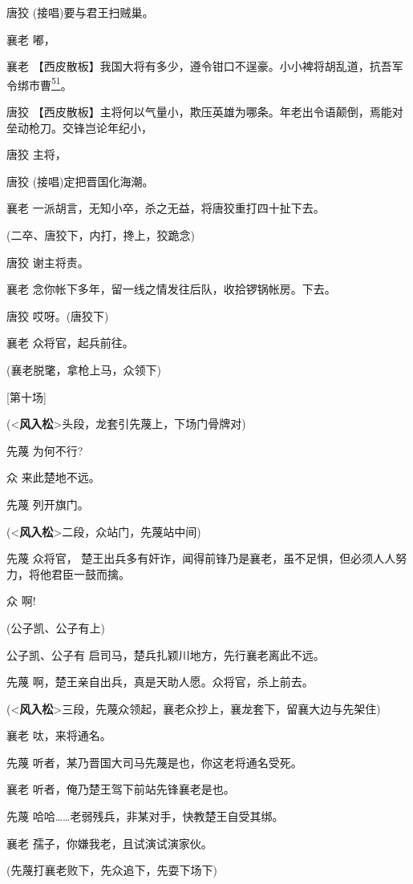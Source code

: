 唐狡 (接唱)要与君王扫贼巢。

襄老 嘟，

襄老
【西皮散板】我国大将有多少，遵令钳口不逞豪。小小裨将胡乱道，抗吾军令绑市曹\protect\hyperlink{fn51}{\textsuperscript{51}}。

唐狡
【西皮散板】主将何以气量小，欺压英雄为哪条。年老出令语颠倒，焉能对垒动枪刀。交锋岂论年纪小，

唐狡 主将，

唐狡 (接唱)定把晋国化海潮。

襄老 一派胡言，无知小卒，杀之无益，将唐狡重打四十扯下去。

(二卒、唐狡下，内打，搀上，狡跪念)

唐狡 谢主将责。

襄老 念你帐下多年，留一线之情发往后队，收拾锣锅帐房。下去。

唐狡 哎呀。(唐狡下)

襄老 众将官，起兵前往。

(襄老脱氅，拿枪上马，众领下)

{[}第十场{]}

(\textless{}\textbf{风入松}\textgreater{}头段，龙套引先蔑上，下场门骨牌对)

先蔑 为何不行?

众 来此楚地不远。

先蔑 列开旗门。

(\textless{}\textbf{风入松}\textgreater{}二段，众站门，先蔑站中间)

先蔑 众将官，
楚王出兵多有奸诈，闻得前锋乃是襄老，虽不足惧，但必须人人努力，将他君臣一鼓而擒。

众 啊!

(公子凯、公子有上)

公子凯、公子有 启司马，楚兵扎颖川地方，先行襄老离此不远。

先蔑 啊，楚王亲自出兵，真是天助人愿。众将官，杀上前去。

(\textless{}\textbf{风入松}\textgreater{}三段，先蔑众领起，襄老众抄上，襄龙套下，留襄大边与先架住)

襄老 呔，来将通名。

先蔑 听者，某乃晋国大司马先蔑是也，你这老将通名受死。

襄老 听者，俺乃楚王驾下前站先锋襄老是也。

先蔑 哈哈\ldots{}\ldots{}老弱残兵，非某对手，快教楚王自受其绑。

襄老 孺子，你嫌我老，且试演试演家伙。

(先蔑打襄老败下，先众追下，先耍下场下)

